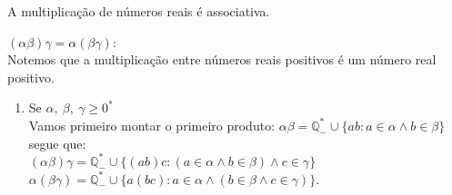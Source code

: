 \documentclass[../main.tex]{subfiles}
\begin{document}
\begin{prop}\label{reais-prop-produtoAssociativo}
    A multiplicação de números reais é associativa.
\end{prop}
\begin{dem}
    $(\alpha\beta)\gamma = \alpha(\beta\gamma)$: \\
    Notemos que a multiplicação entre números reais positivos é um número real positivo.
    \begin{enumerate}
        \item Se $\alpha,\ \beta,\ \gamma \geq 0^*$ \\
            Vamos primeiro montar o primeiro produto:
            $\alpha\beta = \mathbb{Q}_{-}^* \cup \{ ab : a \in \alpha \land b \in \beta \}$ segue que: \\
            $(\alpha\beta)\gamma = \mathbb{Q}_{-}^* \cup \{ (ab)c : (a \in \alpha \land b \in \beta) \land c \in \gamma \}$ \\
            $\alpha(\beta\gamma) = \mathbb{Q}_{-}^* \cup \{ a(bc) : a \in \alpha \land (b \in \beta \land c \in \gamma) \}$.
    

\end{enumerate}
\end{dem}
\end{document}
